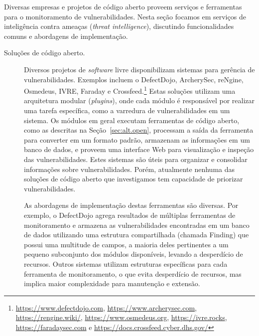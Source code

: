Diversas empresas e projetos de código aberto proveem serviços e ferramentas para o monitoramento de vulnerabilidades. Nesta seção focamos em serviços de inteligência contra ameaças (\emph{threat intelligence}), discutindo funcionalidades comuns e abordagens de implementação.

\begin{description}
    \item[Soluções de código aberto.] Diversos projetos de \emph{software} livre disponibilizam sistemas para gerência de vulnerabilidades. Exemplos incluem o DefectDojo, ArcherySec, reNgine, Osmedeus, IVRE, Faraday e Crossfeed.\footnote{\url{https://www.defectdojo.com}, \url{https://www.archerysec.com}, \url{https://rengine.wiki/}, \url{https://www.osmedeus.org}, \url{https://ivre.rocks}, \url{https://faradaysec.com} e \url{https://docs.crossfeed.cyber.dhs.gov/}}  Estas soluções utilizam uma arquitetura modular (\emph{plugins}), onde cada módulo é responsável por realizar uma tarefa específica, como a varredura de vulnerabilidades em um sistema. Os módulos em geral executam ferramentas de código aberto, como as descritas na Seção~\ref{sec:alt.open}, processam a saída da ferramenta para converter em um formato padrão, armazenam as informações em um banco de dados, e proveem uma interface Web para visualização e inspeção das vulnerabilidades. Estes sistemas são úteis para organizar e consolidar informações sobre vulnerabilidades. Porém, atualmente nenhuma das soluções de código aberto que investigamos tem capacidade de priorizar vulnerabilidades.

    As abordagens de implementação destas ferramentas são diversas. Por exemplo, o DefectDojo agrega resultados de múltiplas ferramentas de monitoramento e armazena as vulnerabilidades encontradas em um banco de dados utilizando uma estrutura compartilhada (chamada \textsf{Finding}) que possui uma multitude de campos, a maioria deles pertinentes a um pequeno subconjunto dos módulos disponíveis, levando a desperdício de recursos. Outros sistemas utilizam estruturas específicas para cada ferramenta de monitoramento, o que evita desperdício de recursos, mas implica maior complexidade para manutenção e extensão.


\end{description}
